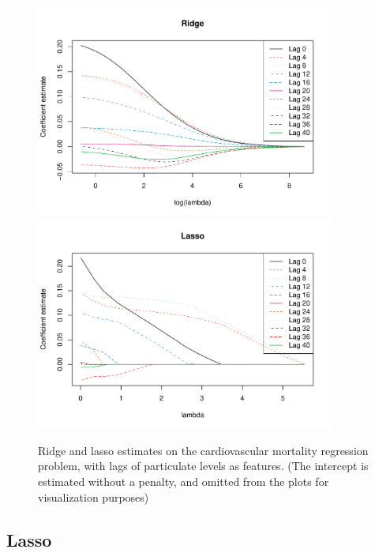 \documentclass{article}
\begin{document}
\begin{itemize}
\begin{figure}[p]
\centering
\includegraphics[width=0.875\textwidth]{fig/cardio-ridge-1.pdf}
\includegraphics[width=0.875\textwidth]{fig/cardio-lasso-1.pdf}
\caption{Ridge and lasso estimates on the cardiovascular mortality regression
  problem, with lags of particulate levels as features. (The intercept is
  estimated without a penalty, and omitted from the plots for visualization 
  purposes)} 
\label{fig:cardio}
\end{figure}
\end{itemize}

\subsection{Lasso}
\end{document}
